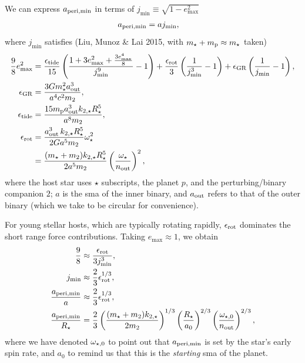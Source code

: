 \documentclass[11pt,
        usenames, %
        dvipsnames %
    ]{article}
\newcommand*{\p}[1]{\left(#1\right)}
\begin{document}
We can express $a_{\rm peri, \min}$ in terms of $j_{\min} \equiv \sqrt{1 -
e_{\max}^2}$
\begin{align}
    a_{\rm peri, \min}
        &=
            aj_{\min},
\end{align}
where $j_{\min}$ satisfies (Liu, Munoz \& Lai 2015, with $m_\star + m_{\rm p}
\approx m_\star$ taken)
\begin{align}
        \frac{9}{8}e_{\max}^2 &=
        \frac{\epsilon_{\rm tide}}{15}
            \p{\frac{1 + 3e_{\max}^2 + \tfrac{3e_{\max}^4}{8}}{j_{\min}^9} - 1}
        +
        \frac{\epsilon_{\rm rot}}{3}
            \p{\frac{1}{j_{\min}^3} - 1}
        +
        \epsilon_{\rm GR} \p{\frac{1}{j_{\min}} - 1},\\
        \label{eq:emax_srfs}
    \epsilon_{\rm GR}
        &= \frac{3Gm_{\star}^2 a_{\rm out}^3}{a^4c^2m_2},\\
    \epsilon_{\rm tide}
        &= \frac{15 m_{\rm p}
            a_{\rm out}^3 k_{2,\star}R_\star^5}{
                a^8 m_2},\\
    \epsilon_{\rm rot}
        &=
            \frac{a_{\rm out}^3\,
                k_{2,\star}R_\star^5}{2Ga^5 m_2}
                \omega_{\rm \star}^2\nonumber\\
        &=
            \frac{(m_\star + m_2)
                k_{2,\star}R_\star^5}{2a^5 m_2}
                \p{\frac{\omega_{\rm \star}}{n_{\rm out}}}^2,
\end{align}
where the host star uses $\star$ subscripts, the planet $p$, and the
perturbing/binary companion $2$; $a$ is the sma of the inner binary, and
$a_{\rm out}$ refers to that of the outer binary (which we take to be circular
for convenience).

For young stellar hosts, which are typically rotating rapidly, $\epsilon_{\rm
rot}$ dominates the short range force contributions.
Taking $e_{\max} \approx 1$, we obtain
\begin{align}
    \frac{9}{8} &\approx \frac{\epsilon_{\rm rot}}{3j_{\min}^3},\\
    j_{\min} &\approx
        \frac{2}{3}\epsilon_{\rm rot}^{1/3},\\
    \frac{a_{\rm peri, \min}}{a}
        &\approx \frac{2}{3}\epsilon_{\rm rot}^{1/3},\\
    \frac{a_{\rm peri, \min}}{R_\star}
        &=
            \frac{2}{3}
            \p{\frac{(m_\star + m_2)k_{2,\star}}{2m_2}}^{1/3}
            \p{\frac{R_\star}{a_0}}^{2/3}
            \p{\frac{\omega_{\rm \star, 0}}{n_{\rm out}}}^{2/3},
\end{align}
where we have denoted $\omega_{\rm \star, 0}$ to point out that $a_{\rm peri,
\min}$ is set by the star's early spin rate, and $a_0$ to remind us that this is
the \emph{starting} sma of the planet.
\end{document}
